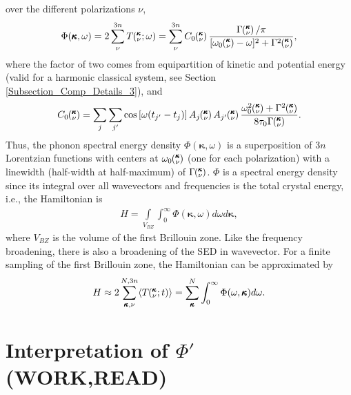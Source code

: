 over the different polarizations $\nu$,
\begin{equation}\label{A:E:Lorentzian_NMD}
\begin{split}
\Phi(\pmb{\kappa},\omega) = 2\sum_{\nu}^{3n} T\kvw=\sum_{\nu}^{3n}C_0\kv
\frac{\Gamma\kv/\pi}{[\omega_0\kv-\omega]^2+\Gamma^2\kv},
\end{split}
\end{equation}
where the factor of two comes from equipartition of kinetic and potential 
energy (valid for a harmonic classical system, see Section 
\ref{Subsection_Comp_Details_3}), and
\begin{equation}\label{A:E:C_0}
\begin{split}
C_0\kv = \sum_j\sum_{j'}\cos\left[\omega (t_{j'}-t_j)\right]A_j\kv A_{j'}
\kv\frac{\omega_0^2\kv+\Gamma^2\kv}{8\tau_0\Gamma\kv}.
\end{split}
\end{equation}
Thus, the phonon spectral energy density $\Phi(\pmb{\kappa},\omega)$ is 
a superposition of $3n$ Lorentzian
functions with centers at $\omega_0\mspace{-4.0mu}\left(\mspace{-8.0mu} \begin{smallmatrix}&\pmb{\kappa} \\&\nu\end{smallmatrix} \mspace{-3.0mu}\right)$ (one for each polarization) with 
a linewidth (half-width at half-maximum) of
$\Gamma\mspace{-4.0mu}\left(\mspace{-8.0mu} \begin{smallmatrix}&\pmb{\kappa} \\&\nu\end{smallmatrix} \mspace{-3.0mu}\right)$. $\Phi$ is a spectral energy density since its integral over 
all wavevectors and frequencies is the total crystal energy, i.e., the Hamiltonian is
\begin{equation}\label{A:E:equipartition}
\begin{split}
H=\int\limits_{V_{BZ}} \int_{0}^{\infty}\Phi(\pmb{\kappa},\omega)d\omega 
d\pmb{\kappa},
\end{split}
\end{equation}
where $V_{BZ}$ is the volume of the first Brillouin zone.  Like the 
frequency broadening, there is also a broadening of the SED in wavevector.
\cite{turney_predicting_2009-1} For a finite sampling of the first Brillouin zone, 
the Hamiltonian can be approximated by
\begin{equation}\label{A:E:equipartition}
\begin{split}
H \approx 2\sum_{\pmb{\kappa},\nu}^{N,3n}\langle T\mspace{-4.0mu}\left(\mspace{-8.0mu} \begin{smallmatrix}&\pmb{\kappa} \\&\nu\end{smallmatrix} \mspace{-2.0mu};t\right)\rangle = 
\sum_{\pmb{\kappa}}^N \int_{0}^{\infty}\Phi(\omega,\pmb{\kappa})d\omega.
\end{split}
\end{equation}


\section{\label{Appendix_B}Interpretation of $\Phi'$ (WORK,READ)}

